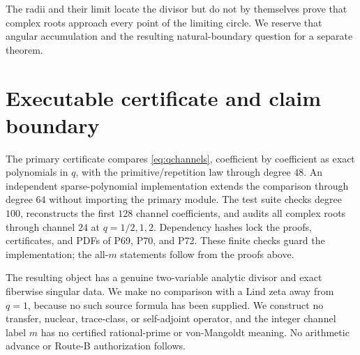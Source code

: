 \documentclass[11pt]{article}
\begin{document}
The radii and their limit locate the divisor but do not by themselves prove
that complex roots approach every point of the limiting circle.  We reserve
that angular accumulation and the resulting natural-boundary question for a
separate theorem.

\section{Executable certificate and claim boundary}

The primary certificate compares \eqref{eq:qchannels}, coefficient by
coefficient as exact polynomials in $q$, with the primitive/repetition law
through degree $48$.  An independent sparse-polynomial implementation
extends the comparison through degree $64$ without importing the primary
module.  The test suite checks degree $100$, reconstructs the first $128$
channel coefficients, and audits all complex roots through channel $24$ at
$q=1/2,1,2$.  Dependency hashes lock the proofs, certificates, and PDFs of
P69, P70, and P72.  These finite checks guard the implementation; the
all-$m$ statements follow from the proofs above.

The resulting object has a genuine two-variable analytic divisor and exact
fiberwise singular data.  We make no comparison with a Lind zeta away from
$q=1$, because no such source formula has been supplied.  We construct no
transfer, nuclear, trace-class, or self-adjoint operator, and the integer
channel label $m$ has no certified rational-prime or von-Mangoldt meaning.
No arithmetic advance or Route-B authorization follows.



\end{document}
